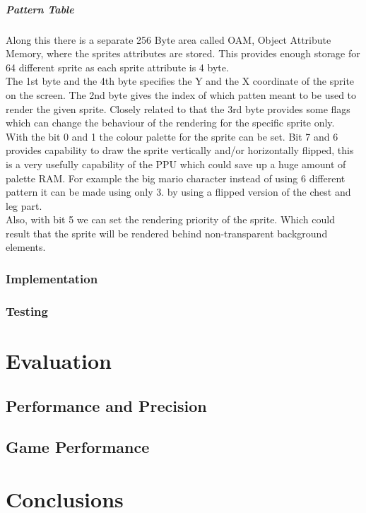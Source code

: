 \documentclass[]{report}
\begin{document}
\paragraph{Pattern Table}


\paragraph{ }
Along this there is a separate 256 Byte area called OAM, Object Attribute Memory, where the sprites attributes are stored. This provides enough storage for 64 different sprite as each sprite attribute is 4 byte. 
\\
The 1st byte and the 4th byte specifies the Y and the X coordinate of the sprite on the screen. The 2nd byte gives the index of which patten meant to be used to render the given sprite. Closely related to that the 3rd byte provides some flags which can change the behaviour of the rendering for the specific sprite only. 
\\
With the bit 0 and 1 the colour palette for the sprite can be set. Bit 7 and 6 provides capability to draw the sprite vertically and/or horizontally flipped, this is a very usefully capability of the PPU which could save up a huge amount of palette RAM. For example the big mario character instead of using 6 different pattern it can be made using only 3. by using a flipped version of the chest and leg part.
\\
 Also, with bit 5 we can set the rendering priority of the sprite. Which could result that the sprite will be rendered behind non-transparent background elements.

\subsection{Implementation}

\subsection{Testing}

 \chapter{Evaluation}

\section{Performance and Precision}

\section{Game Performance}

\chapter{Conclusions}

\printbibliography
\end{document}
